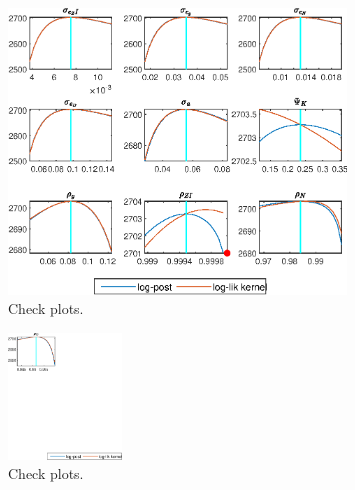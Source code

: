  
\begin{figure}[H]
\centering 
\includegraphics[width=0.80\textwidth]{BRS_growth_ext_fd_v1/graphs/BRS_growth_ext_fd_v1_CheckPlots1}
\caption{Check plots.}\label{Fig:CheckPlots:1}
\end{figure}
 
\begin{figure}[H]
\centering 
\includegraphics[width=0.27\textwidth]{BRS_growth_ext_fd_v1/graphs/BRS_growth_ext_fd_v1_CheckPlots2}
\caption{Check plots.}\label{Fig:CheckPlots:2}
\end{figure}
 
